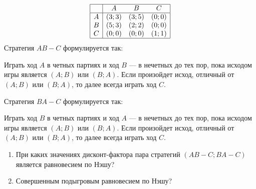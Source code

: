 \begin{problem}

\[\begin{array}{|c|ccc|}  \hline {} & {A} & {B} & {C} \\  \hline {A} & {\left(3;3\right)} & {\left(3;5\right)} & {\left(0;0\right)} \\ {B} & {\left(5;3\right)} & {\left(2;2\right)} & {\left(0;0\right)} \\ {C} & {\left(0;0\right)} & {\left(0;0\right)} & {\left(1;1\right)} \\  \hline  \end{array}\]
Стратегия  $AB-C$  формулируется так:\par
Играть ход  $A$  в четных партиях и ход  $B$  --- в нечетных до тех пор, пока исходом игры является  $\left(A;B\right)$  или  $\left(B;A\right)$. Если произойдет исход, отличный от  $\left(A;B\right)$  или  $\left(B;A\right)$, то далее всегда играть ход  $C$.\par
Стратегия  $BA-C$  формулируется так:\par
Играть ход  $B$  в четных партиях и ход  $A$  --- в нечетных до тех пор, пока исходом игры является  $\left(A;B\right)$  или  $\left(B;A\right)$. Если произойдет исход, отличный от  $\left(A;B\right)$  или  $\left(B;A\right)$, то далее всегда играть ход  $C$.\par
\begin{enumerate}
\item При каких значениях дисконт-фактора пара стратегий  $\left(AB-C;BA-C\right)$  является равновесием по Нэшу?\par
\item Совершенным подыгровым равновесием по Нэшу?
\end{enumerate}


\begin{sol}

\end{sol}
\end{problem}




